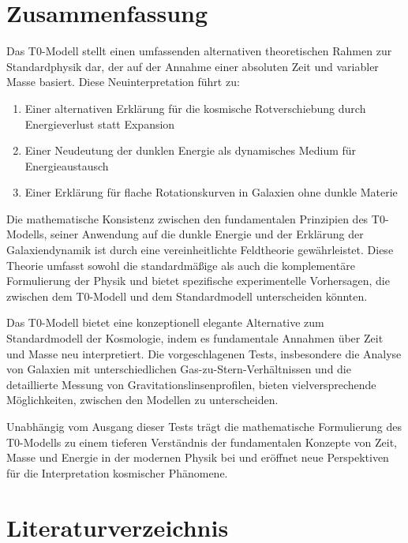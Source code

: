 \documentclass[a4paper,12pt]{article}
\theoremstyle{definition}
\theoremstyle{remark}
\begin{document}
	\section{Zusammenfassung}
	
	Das T0-Modell stellt einen umfassenden alternativen theoretischen Rahmen zur Standardphysik dar, der auf der Annahme einer absoluten Zeit und variabler Masse basiert. Diese Neuinterpretation führt zu:
	
	\begin{enumerate}
		\item Einer alternativen Erklärung für die kosmische Rotverschiebung durch Energieverlust statt Expansion
		\item Einer Neudeutung der dunklen Energie als dynamisches Medium für Energieaustausch
		\item Einer Erklärung für flache Rotationskurven in Galaxien ohne dunkle Materie
	\end{enumerate}
	
	Die mathematische Konsistenz zwischen den fundamentalen Prinzipien des T0-Modells, seiner Anwendung auf die dunkle Energie und der Erklärung der Galaxiendynamik ist durch eine vereinheitlichte Feldtheorie gewährleistet. Diese Theorie umfasst sowohl die standardmäßige als auch die komplementäre Formulierung der Physik und bietet spezifische experimentelle Vorhersagen, die zwischen dem T0-Modell und dem Standardmodell unterscheiden könnten.
	
	Das T0-Modell bietet eine konzeptionell elegante Alternative zum Standardmodell der Kosmologie, indem es fundamentale Annahmen über Zeit und Masse neu interpretiert. Die vorgeschlagenen Tests, insbesondere die Analyse von Galaxien mit unterschiedlichen Gas-zu-Stern-Verhältnissen und die detaillierte Messung von Gravitationslinsenprofilen, bieten vielversprechende Möglichkeiten, zwischen den Modellen zu unterscheiden.
	
	Unabhängig vom Ausgang dieser Tests trägt die mathematische Formulierung des T0-Modells zu einem tieferen Verständnis der fundamentalen Konzepte von Zeit, Masse und Energie in der modernen Physik bei und eröffnet neue Perspektiven für die Interpretation kosmischer Phänomene.
	
	\section{Literaturverzeichnis}
	
\end{document}
